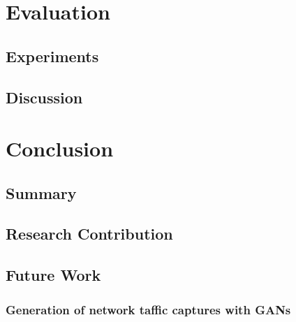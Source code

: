 \documentclass[
	ngerman,
	ruledheaders=section,%
	class=report,%
	thesis={type=bachelor},%
	accentcolor=9c,%
	custommargins=true,%
	marginpar=false,%
	parskip=half-,%
	fontsize=11pt,%
]{tudapub}
\begin{document}
\chapter{Evaluation}

\section{Experiments}

\section{Discussion}

\chapter{Conclusion}


\section{Summary}

\section{Research Contribution}

\section{Future Work}

\subsection{Generation of network taffic captures with GANs}

\printbibliography
\end{document}

